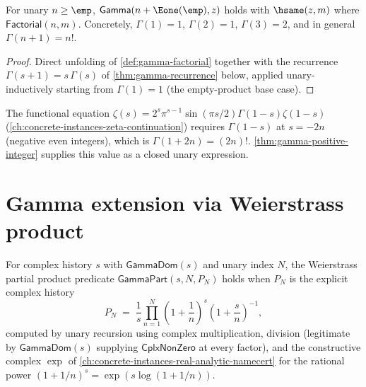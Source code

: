 \begin{theorem}
\label{thm:gamma-positive-integer}
For unary \(n \geq \emp\), \(\mathsf{Gamma}(n + \Eone(\emp), z)\) holds with \(\hsame(z, m)\) where \(\mathsf{Factorial}(n, m)\). Concretely, \(\Gamma(1) = 1\), \(\Gamma(2) = 1\), \(\Gamma(3) = 2\), and in general \(\Gamma(n+1) = n!\).
\end{theorem}
\begin{proof}
Direct unfolding of \autoref{def:gamma-factorial} together with the recurrence \(\Gamma(s+1) = s\,\Gamma(s)\) of \autoref{thm:gamma-recurrence} below, applied unary-inductively starting from \(\Gamma(1) = 1\) (the empty-product base case).
\end{proof}

\begin{remark}
The functional equation \(\zeta(s) = 2^s \pi^{s-1} \sin(\pi s/2) \Gamma(1-s) \zeta(1-s)\) (\autoref{ch:concrete-instances-zeta-continuation}) requires \(\Gamma(1-s)\) at \(s = -2n\) (negative even integers), which is \(\Gamma(1+2n) = (2n)!\). \autoref{thm:gamma-positive-integer} supplies this value as a closed unary expression.
\end{remark}

\section{Gamma extension via Weierstrass product}
\label{sec:gamma-weierstrass}

\begin{definition}
\label{def:gamma-weierstrass-part}
For complex history \(s\) with \(\mathsf{GammaDom}(s)\) and unary index \(N\), the Weierstrass partial product predicate \(\mathsf{GammaPart}(s, N, P_N)\) holds when \(P_N\) is the explicit complex history
$$
P_N \;=\; \frac{1}{s} \prod_{n=1}^{N} \left(1 + \frac{1}{n}\right)^{s} \left(1 + \frac{s}{n}\right)^{-1},
$$
computed by unary recursion using complex multiplication, division (legitimate by \(\mathsf{GammaDom}(s)\) supplying \(\mathsf{CplxNonZero}\) at every factor), and the constructive complex \(\exp\) of \autoref{ch:concrete-instances-real-analytic-namecert} for the rational power \((1 + 1/n)^s = \exp(s \log(1 + 1/n))\).
\end{definition}

